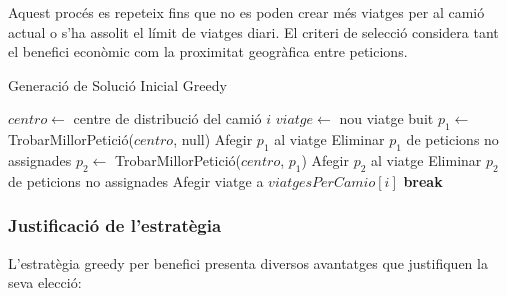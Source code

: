 Aquest procés es repeteix fins que no es poden crear més viatges per al camió actual o s'ha assolit el límit de viatges diari. El criteri de selecció considera tant el benefici econòmic com la proximitat geogràfica entre peticions.

\begin{algorithm}[H]
\caption{Generació de Solució Inicial Greedy}
\begin{algorithmic}[1]
        \State $centro \gets$ centre de distribució del camió $i$
            \State $viatge \gets$ nou viatge buit
            \State $p_1 \gets$ TrobarMillorPetició($centro$, null)
                \State Afegir $p_1$ al viatge
                \State Eliminar $p_1$ de peticions no assignades
                \State $p_2 \gets$ TrobarMillorPetició($centro$, $p_1$)
                    \State Afegir $p_2$ al viatge
                    \State Eliminar $p_2$ de peticions no assignades
                \EndIf
                \State Afegir viatge a $viatgesPerCamio[i]$
            \Else
                \State \textbf{break} 
            \EndIf
        \EndFor
    \EndFor
\EndProcedure
\end{algorithmic}
\end{algorithm}

\subsubsection{Justificació de l'estratègia}

L'estratègia greedy per benefici presenta diversos avantatges que justifiquen la seva elecció:

